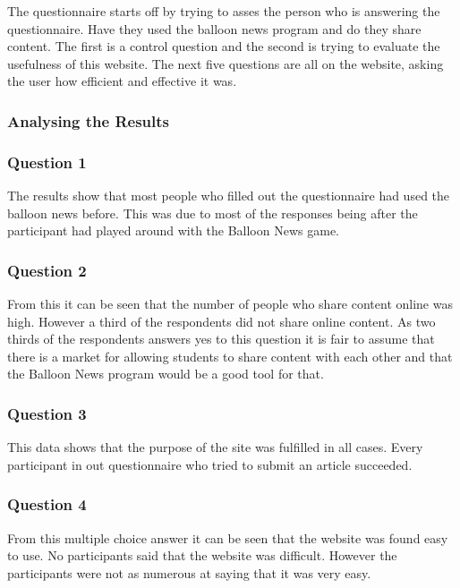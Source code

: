 The questionnaire starts off by trying to asses the person who is answering the questionnaire. Have they used the balloon news program and do they share content. The first is a control question and the second is trying to evaluate the usefulness of this website. The next five questions are all on the website, asking the user how efficient and effective it was.

\subsubsection{Analysing the Results}

\subsubsection*{Question 1}
The results show that most people who filled out the questionnaire had used the balloon news before. This was due to most of the responses being after the participant had played around with the Balloon News game.

\subsubsection*{Question 2}
From this it can be seen that the number of people who share content online was high. However a third of the respondents did not share online content. As two thirds of the respondents answers yes to this question it is fair to assume that there is a market for allowing students to share content with each other and that the Balloon News program would be a good tool for that. 

\clearpage{}
\subsubsection*{Question 3}
This data shows that the purpose of the site was fulfilled in all cases. Every participant in out questionnaire who tried to submit an article succeeded.

\subsubsection*{Question 4}
From this multiple choice answer it can be seen that the website was found easy to use. No participants said that the website was difficult. However the participants were not as numerous at saying that it was very easy. 

